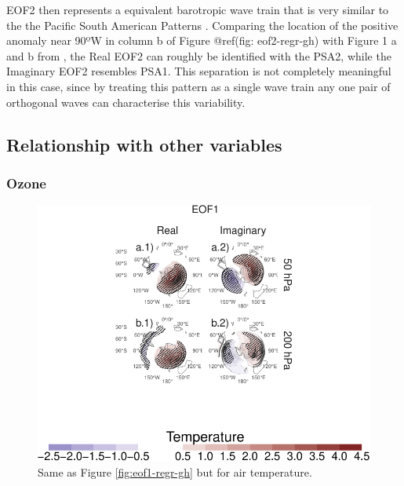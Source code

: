 \documentclass[smallextended]{svjour3}       %
\begin{document}
EOF2 then represents a equivalent barotropic wave train that is very similar to the the Pacific South American Patterns \citep{mo2001}. Comparing the location of the positive anomaly near 90ºW in column b of Figure @ref(fig: eof2-regr-gh) with Figure 1 a and b from \citet{mo2001}, the Real EOF2 can roughly be identified with the PSA2, while the Imaginary EOF2 resembles PSA1. This separation is not completely meaningful in this case, since by treating this pattern as a single wave train any one pair of orthogonal waves can characterise this variability.

\hypertarget{relationship-with-other-variables}{%
\subsection{Relationship with other variables}\label{relationship-with-other-variables}}

\hypertarget{ozone}{%
\subsubsection{Ozone}\label{ozone}}



\begin{figure}
\centering
\includegraphics{../figures/eof1-regr-t-1.pdf}
\caption{\label{fig:eof1-regr-t}Same as Figure \ref{fig:eof1-regr-gh} but for air temperature.}
\end{figure}
\end{document}
